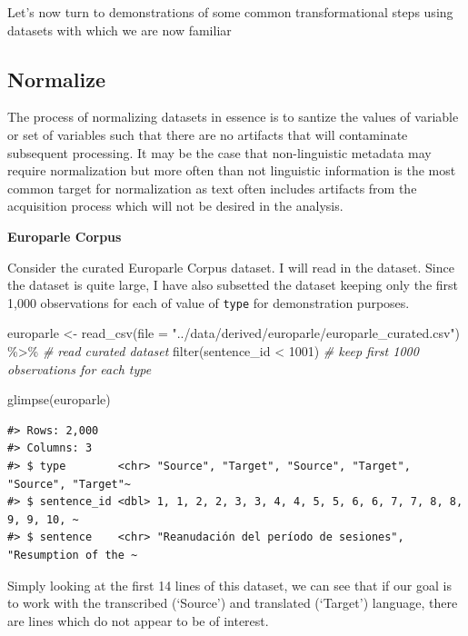 \documentclass[
]{article}
\newenvironment{Shaded}{\begin{snugshade}}{\end{snugshade}}
\newcommand{\AttributeTok}[1]{\textcolor[rgb]{0.77,0.63,0.00}{#1}}
\newcommand{\CommentTok}[1]{\textcolor[rgb]{0.56,0.35,0.01}{\textit{#1}}}
\newcommand{\DecValTok}[1]{\textcolor[rgb]{0.00,0.00,0.81}{#1}}
\newcommand{\FunctionTok}[1]{\textcolor[rgb]{0.00,0.00,0.00}{#1}}
\newcommand{\NormalTok}[1]{#1}
\newcommand{\OtherTok}[1]{\textcolor[rgb]{0.56,0.35,0.01}{#1}}
\newcommand{\SpecialCharTok}[1]{\textcolor[rgb]{0.00,0.00,0.00}{#1}}
\newcommand{\StringTok}[1]{\textcolor[rgb]{0.31,0.60,0.02}{#1}}
\begin{document}
Let's now turn to demonstrations of some common transformational steps using datasets with which we are now familiar

\hypertarget{normalize}{%
\subsection{Normalize}\label{normalize}}

The process of normalizing datasets in essence is to santize the values of variable or set of variables such that there are no artifacts that will contaminate subsequent processing. It may be the case that non-linguistic metadata may require normalization but more often than not linguistic information is the most common target for normalization as text often includes artifacts from the acquisition process which will not be desired in the analysis.

\textbf{Europarle Corpus}

Consider the curated Europarle Corpus dataset. I will read in the dataset. Since the dataset is quite large, I have also subsetted the dataset keeping only the first 1,000 observations for each of value of \texttt{type} for demonstration purposes.

\begin{Shaded}
\begin{Highlighting}[]
\NormalTok{europarle }\OtherTok{\textless{}{-}} \FunctionTok{read\_csv}\NormalTok{(}\AttributeTok{file =} \StringTok{"../data/derived/europarle/europarle\_curated.csv"}\NormalTok{) }\SpecialCharTok{\%\textgreater{}\%}  \CommentTok{\# read curated dataset}
  \FunctionTok{filter}\NormalTok{(sentence\_id }\SpecialCharTok{\textless{}} \DecValTok{1001}\NormalTok{) }\CommentTok{\# keep first 1000 observations for each type}

\FunctionTok{glimpse}\NormalTok{(europarle)}
\end{Highlighting}
\end{Shaded}

\begin{verbatim}
#> Rows: 2,000
#> Columns: 3
#> $ type        <chr> "Source", "Target", "Source", "Target", "Source", "Target"~
#> $ sentence_id <dbl> 1, 1, 2, 2, 3, 3, 4, 4, 5, 5, 6, 6, 7, 7, 8, 8, 9, 9, 10, ~
#> $ sentence    <chr> "Reanudación del período de sesiones", "Resumption of the ~
\end{verbatim}

Simply looking at the first 14 lines of this dataset, we can see that if our goal is to work with the transcribed (`Source') and translated (`Target') language, there are lines which do not appear to be of interest.
\end{document}
